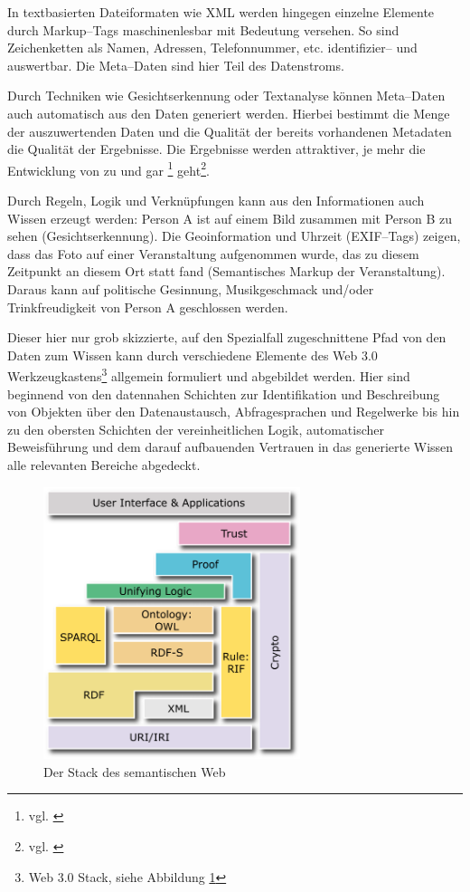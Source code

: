 In textbasierten Dateiformaten wie XML werden hingegen einzelne Elemente durch Markup--Tags maschinenlesbar mit Bedeutung versehen. So sind Zeichenketten als Namen, Adressen, Telefonnummer,  etc. identifizier-- und auswertbar. Die Meta--Daten sind hier Teil des Datenstroms.

Durch Techniken wie Gesichtserkennung oder Textanalyse können Meta--Daten auch automatisch aus den Daten generiert werden. Hierbei bestimmt die Menge der auszuwertenden Daten und die Qualität der bereits vorhandenen Metadaten die Qualität der Ergebnisse. Die Ergebnisse werden attraktiver, je mehr die Entwicklung von  zu  und gar \footnote{vgl. \cite{bigdikw}} geht\footnote{vgl. \cite{faz:inng}}.

Durch Regeln, Logik und Verknüpfungen kann aus den Informationen auch Wissen erzeugt werden:
Person A ist auf einem Bild zusammen mit Person B zu sehen (Gesichtserkennung). Die Geoinformation und Uhrzeit (EXIF--Tags) zeigen, dass das Foto auf einer Veranstaltung aufgenommen wurde, das zu diesem Zeitpunkt an diesem Ort statt fand (Semantisches Markup der Veranstaltung).
Daraus kann auf politische Gesinnung, Musikgeschmack und/oder Trinkfreudigkeit von Person A geschlossen werden.

Dieser hier nur grob skizzierte, auf den Spezialfall zugeschnittene Pfad von den Daten zum Wissen kann durch verschiedene Elemente des Web 3.0 Werkzeugkastens\footnote{Web 3.0 Stack, siehe Abbildung \ref{pic:semanticstack}} allgemein formuliert und abgebildet werden. Hier sind beginnend von den datennahen Schichten zur Identifikation und Beschreibung von Objekten über den Datenaustausch, Abfragesprachen und Regelwerke bis hin zu den obersten Schichten der vereinheitlichen Logik, automatischer Beweisführung und dem darauf aufbauenden Vertrauen in das generierte Wissen alle relevanten Bereiche abgedeckt.

\begin{figure}[H]
\begin{center}
\includegraphics[width=0.67\textwidth]{layerCake-4.png}
\caption[Der Stack des semantischen Web]{Der Stack des semantischen Web\protect\footnotemark}
\label{pic:semanticstack}
\end{center}
\end{figure}
